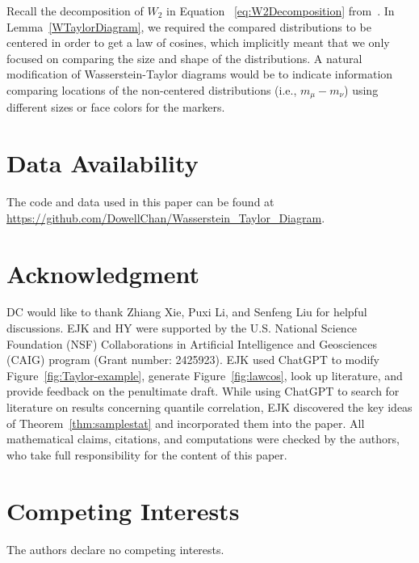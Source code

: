 \documentclass{amsart}
\numberwithin{equation}{section}
\theoremstyle{plain}
\theoremstyle{definition}
\begin{document}
Recall the decomposition of $W_2$ in Equation ~\eqref{eq:W2Decomposition} from~\cite{irpino2007optimal}.
In Lemma~\ref{WTaylorDiagram}, we required the compared distributions to be centered in order to get a law of cosines, which implicitly meant that we only focused on comparing the size and shape of the distributions.
A natural modification of Wasserstein-Taylor diagrams would be to indicate information comparing locations of the non-centered distributions  (i.e., $m_\mu - m_\nu$) using different sizes or face colors for the markers.


\section*{Data Availability}
The code and data used in this paper can be found at \url{https://github.com/DowellChan/Wasserstein_Taylor_Diagram}.

\section*{Acknowledgment}
DC would like to thank Zhiang Xie, Puxi Li, and Senfeng Liu for helpful discussions.  
EJK and HY were supported by the U.S. National Science Foundation (NSF) Collaborations 
in Artificial Intelligence and Geosciences (CAIG) program (Grant number: 2425923). 
EJK used ChatGPT to modify Figure~\ref{fig:Taylor-example}, generate Figure~\ref{fig:lawcos}, look up literature, and provide feedback on the penultimate draft. 
While using ChatGPT to search for literature on results concerning quantile correlation, EJK discovered the key ideas of Theorem~\ref{thm:samplestat} and incorporated them into the paper.
All mathematical claims, citations, and computations were checked by the authors, who take full responsibility for the content of this paper.

\section*{Competing Interests}
The authors declare no competing interests.

 

\end{document}
